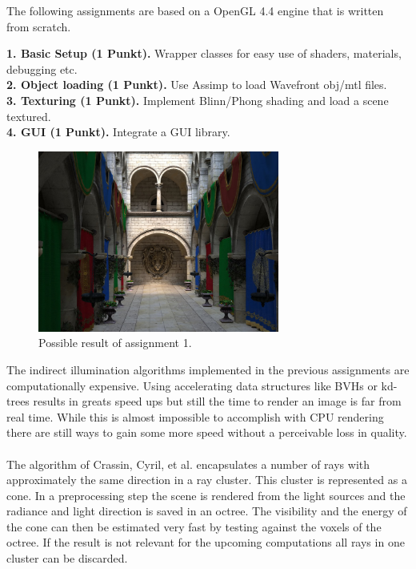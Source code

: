 \documentclass[A4paper]{gdv/gdv}
\newcommand{\teilaufgabe}[1]{\textbf{#1.}}
\begin{document}
\begin{gdvSheet}
  
\newcommand{\file}[1]{\texttt{#1}}
\newcommand{\code}[1]{\texttt{#1}}

The following assignments are based on a OpenGL 4.4 engine that is written from scratch. 

\teilaufgabe{1. Basic Setup (1 Punkt)} Wrapper classes for easy use of shaders, materials, debugging etc. \\
\teilaufgabe{2. Object loading (1 Punkt)} Use Assimp to load Wavefront obj/mtl files. \\
\teilaufgabe{3. Texturing (1 Punkt)} Implement Blinn/Phong shading and load a scene textured. \\
\teilaufgabe{4. GUI (1 Punkt)} Integrate a GUI library. \\

\begin{figure}[h]
\centering
\includegraphics[width=300px]{img/sponza.jpg}
\caption{Possible result of assignment 1.}
\end{figure}

The indirect illumination algorithms implemented in the previous assignments are computationally expensive. Using accelerating data structures like BVHs or kd-trees results in greats speed ups but still the time to render an image is far from real time. While this is almost impossible to accomplish with CPU rendering there are still ways to gain some more speed without a perceivable loss in quality. \\
\\
The algorithm of Crassin, Cyril, et al. encapsulates a number of rays with approximately the same direction in a ray cluster. This cluster is represented as a cone. In a preprocessing step the scene is rendered from the light sources and the radiance and light direction is saved in an octree. The visibility and the energy of the cone can then be estimated very fast by testing against the voxels of the octree. If the result is not relevant for the upcoming computations all rays in one cluster can be discarded.


\end{gdvSheet}
\end{document}
